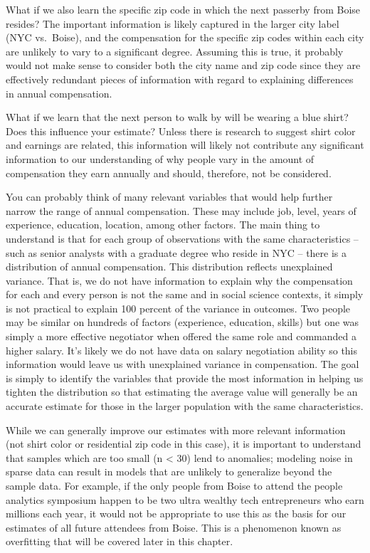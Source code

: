 \documentclass[]{book}
\begin{document}
What if we also learn the specific zip code in which the next passerby from Boise resides? The important information is likely captured in the larger city label (NYC vs.~Boise), and the compensation for the specific zip codes within each city are unlikely to vary to a significant degree. Assuming this is true, it probably would not make sense to consider both the city name and zip code since they are effectively redundant pieces of information with regard to explaining differences in annual compensation.

What if we learn that the next person to walk by will be wearing a blue shirt? Does this influence your estimate? Unless there is research to suggest shirt color and earnings are related, this information will likely not contribute any significant information to our understanding of why people vary in the amount of compensation they earn annually and should, therefore, not be considered.

You can probably think of many relevant variables that would help further narrow the range of annual compensation. These may include job, level, years of experience, education, location, among other factors. The main thing to understand is that for each group of observations with the same characteristics -- such as senior analysts with a graduate degree who reside in NYC -- there is a distribution of annual compensation. This distribution reflects unexplained variance. That is, we do not have information to explain why the compensation for each and every person is not the same and in social science contexts, it simply is not practical to explain 100 percent of the variance in outcomes. Two people may be similar on hundreds of factors (experience, education, skills) but one was simply a more effective negotiator when offered the same role and commanded a higher salary. It's likely we do not have data on salary negotiation ability so this information would leave us with unexplained variance in compensation. The goal is simply to identify the variables that provide the most information in helping us tighten the distribution so that estimating the average value will generally be an accurate estimate for those in the larger population with the same characteristics.

While we can generally improve our estimates with more relevant information (not shirt color or residential zip code in this case), it is important to understand that samples which are too small (n \textless{} 30) lend to anomalies; modeling noise in sparse data can result in models that are unlikely to generalize beyond the sample data. For example, if the only people from Boise to attend the people analytics symposium happen to be two ultra wealthy tech entrepreneurs who earn millions each year, it would not be appropriate to use this as the basis for our estimates of all future attendees from Boise. This is a phenomenon known as overfitting that will be covered later in this chapter.
\end{document}
